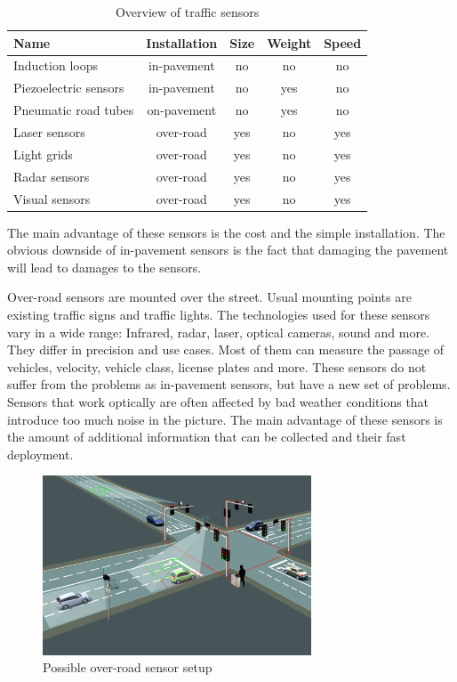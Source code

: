 \begin{table}[hb!]
	\centering
	\begin{tabular}{l|c|c|c|c}
		Name & Installation & Size & Weight & Speed \\
		\hline\hline
		Induction loops & in-pavement & no & no & no \\
		Piezoelectric sensors & in-pavement & no & yes & no \\
		Pneumatic road tubes & on-pavement & no & yes & no \\
		Laser sensors & over-road & yes & no & yes \\
		Light grids & over-road & yes & no & yes \\
		Radar sensors & over-road & yes & no & yes \\
		Visual sensors & over-road & yes & no & yes \\
	\end{tabular}
	\caption{Overview of traffic sensors}
	\label{sensor_overview}
\end{table}

The main advantage of these sensors is the cost and the simple installation. The obvious downside of in-pavement sensors is the fact that damaging the pavement will lead to damages to the sensors.

Over-road sensors are mounted over the street. Usual mounting points are existing traffic signs and traffic lights. The technologies used for these sensors vary in a wide range: Infrared, radar, laser, optical cameras, sound and more. They differ in precision and use cases. Most of them can measure the passage of vehicles, velocity, vehicle class, license plates and more. These sensors do not suffer from the problems as in-pavement sensors, but have a new set of problems. Sensors that work optically are often affected by bad weather conditions that introduce too much noise in the picture. The main advantage of these sensors is the amount of additional information that can be collected and their fast deployment. \cite{tdh}

\begin{figure}[ht]
	\centering
	\includegraphics[width=8cm]{figures/overroad-sensor}
	\caption{Possible over-road sensor setup}
	\label{overroad-sensor}
\end{figure}

